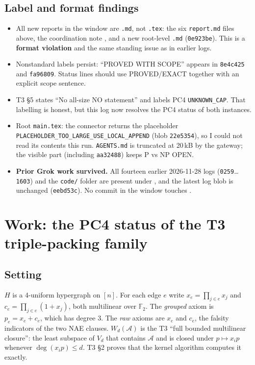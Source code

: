 \documentclass[11pt]{article}
\theoremstyle{remark}
\newcommand{\F}{\mathbb{F}}
\begin{document}
\subsection{Label and format findings}
\begin{itemize}
\item All new reports in the window are \texttt{.md}, not \texttt{.tex}: the six
\texttt{report.md} files above, the coordination note
, and a new
root-level \texttt{.md} (\texttt{0e923be}). This is a \textbf{format violation} and the same
standing issue as in earlier logs.
\item Nonstandard labels persist: ``PROVED WITH SCOPE'' appears in \texttt{8e4c425} and
\texttt{fa96809}. Status lines should use PROVED/EXACT together with an explicit scope
sentence.
\item T3 \S5 states ``No all-size NO statement'' and labels PC4 \texttt{UNKNOWN\_CAP}. That
labelling is honest, but this log now resolves the PC4 status of both instances.
\item Root \texttt{main.tex}: the connector returns the placeholder
\texttt{PLACEHOLDER\_TOO\_LARGE\_USE\_LOCAL\_APPEND} (blob \texttt{22e5354}), so I could not
read its contents this run. \texttt{AGENTS.md} is truncated at 20\,kB by the gateway; the
visible part (including \texttt{aa32488}) keeps P vs NP OPEN.
\item \textbf{Prior Grok work survived.} All fourteen earlier 2026-11-28 logs
(\texttt{0259}\ldots\texttt{1603}) and the \texttt{code/} folder are present under
, and the latest log blob is unchanged
(\texttt{eebd53c}). No commit in the window touches .
\end{itemize}

\section{Work: the PC4 status of the T3 triple-packing family}
\subsection{Setting}
$H$ is a 4-uniform hypergraph on $[n]$. For each edge $e$ write
$x_e=\prod_{j\in e}x_j$ and $c_e=\prod_{j\in e}(1+x_j)$, both multilinear over $\F_2$. The
\emph{grouped} axiom is $p_e=x_e+c_e$, which has degree 3. The \emph{raw} axioms are $x_e$
and $c_e$, the falsity indicators of the two NAE clauses. $W_d(\mathcal A)$ is the T3 ``full
bounded multilinear closure'': the least subspace of $V_d$ that contains $\mathcal A$ and is
closed under $p\mapsto x_ip$ whenever $\deg(x_ip)\le d$. T3 \S2 proves that the kernel
algorithm computes it exactly.
\end{document}
